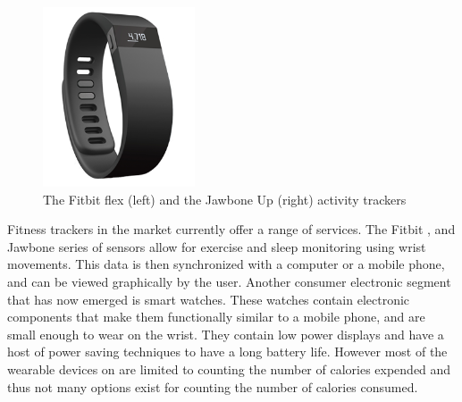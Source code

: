\begin{figure}
\begin{center}
\includegraphics[width=0.4\textwidth]{images/JawFit.png}
\caption{The Fitbit flex (left) and the Jawbone Up (right) activity trackers}
\label{fig:FitbitJawbone}

\end{center}
\end{figure}
Fitness trackers in the market currently offer a range of services. The Fitbit \cite{Web:FitBitOfficial},\cite{Web:FitbitFlex} and Jawbone \cite{Web:JawBoneWebsite} series of sensors allow for exercise and sleep monitoring using wrist movements. This data is then synchronized with a computer or a mobile phone, and can be viewed graphically by the user. Another consumer electronic segment that has now emerged is smart watches. These watches contain electronic components that make them functionally similar to a mobile phone, and are small enough to wear on the wrist. They contain low power displays and have a host of power saving techniques to have a long battery life. However most of the wearable devices on are limited to counting the number of calories expended and thus not many options exist for counting the number of calories consumed.

